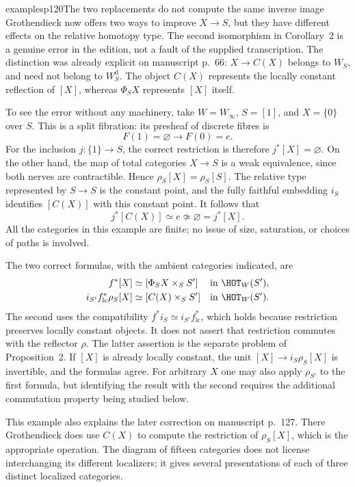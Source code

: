 \begin{dcomment}{examples}{p120}{The two replacements do not compute the same inverse image}
Grothendieck now offers two ways to improve $X\to S$, but they have different effects on the relative homotopy type. The second isomorphism in Corollary~2 is a genuine error in the edition, not a fault of the supplied transcription. The distinction was already explicit on manuscript p.~66: $X\to C(X)$ belongs to $W_S$, and need not belong to $W_S^{\mathrm d}$. The object $C(X)$ represents the locally constant reflection of $[X]$, whereas $\Phi_SX$ represents $[X]$ itself.

To see the error without any machinery, take $W=W_\infty$, $S=[1]$, and $X=\{0\}$ over $S$. This is a split fibration: its presheaf of discrete fibres is
\[
 F(1)=\varnothing\longrightarrow F(0)=e.
\]
For the inclusion $j:\{1\}\to S$, the correct restriction is therefore $j^*[X]=\varnothing$. On the other hand, the map of total categories $X\to S$ is a weak equivalence, since both nerves are contractible. Hence $\rho_S[X]=\rho_S[S]$. The relative type represented by $S\to S$ is the constant point, and the fully faithful embedding $i_S$ identifies $[C(X)]$ with this constant point. It follows that
\[
 j^*[C(X)]\simeq e\not\simeq\varnothing=j^*[X].
\]
All the categories in this example are finite; no issue of size, saturation, or choices of paths is involved.

The two correct formulas, with the ambient categories indicated, are
\[
 \begin{aligned}
 f^*[X]&\simeq[\Phi_SX\times_S S']&&\text{in }\HOT_W(S'),\\
 i_{S'}f^*_{\mathrm{lc}}\rho_S[X]
   &\simeq[C(X)\times_S S']&&\text{in }\HOT_W(S').
 \end{aligned}
\]
The second uses the compatibility $f^*i_S\simeq i_{S'}f^*_{\mathrm{lc}}$, which holds because restriction preserves locally constant objects. It does not assert that restriction commutes with the reflector $\rho$. The latter assertion is the separate problem of Proposition~2. If $[X]$ is already locally constant, the unit $[X]\to i_S\rho_S[X]$ is invertible, and the formulas agree. For arbitrary $X$ one may also apply $\rho_{S'}$ to the first formula, but identifying the result with the second requires the additional commutation property being studied below.

This example also explains the later correction on manuscript p.~127. There Grothendieck does use $C(X)$ to compute the restriction of $\rho_S[X]$, which is the appropriate operation. The diagram of fifteen categories does not license interchanging its different localizers; it gives several presentations of each of three distinct localized categories.
\end{dcomment}

